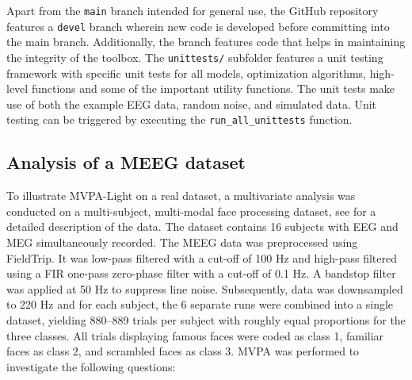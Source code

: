 \documentclass[utf8]{frontiersSCNS} %
\newcommand{\ttt}[1]{\texttt{#1}}
\begin{document}
Apart from the \ttt{main} branch intended for general use, the GitHub repository features a \ttt{devel} branch wherein new code is developed before committing into the main branch. Additionally, the branch features code that helps in maintaining the integrity of the toolbox. The \ttt{unittests/} subfolder features a unit testing framework with specific unit tests for all models, optimization algorithms, high-level functions and some of the important utility functions. The unit tests make use of both the example EEG data, random noise, and simulated data. Unit testing can be triggered by executing the \ttt{run\_all\_unittests} function.

\subsection{Analysis of a MEEG dataset}

To illustrate MVPA-Light on a real dataset, a multivariate analysis was conducted on a multi-subject, multi-modal face processing dataset, see  \cite{Wakeman2015ADataset,Wakeman2014OpenfMRI} for a detailed description of the data. The dataset contains 16 subjects with EEG and MEG simultaneously recorded. The MEEG data was preprocessed using FieldTrip. It was low-pass filtered with a cut-off of 100 Hz and high-pass filtered using a FIR one-pass zero-phase filter with a cut-off of 0.1 Hz. A bandstop filter was applied at 50 Hz to suppress line noise. Subsequently, data was downsampled to 220 Hz and for each subject, the 6 separate runs were combined into a single dataset, yielding 880--889 trials per subject with roughly equal proportions for the three classes. All trials displaying famous faces were coded as class 1, familiar faces as class 2, and scrambled faces as class 3. MVPA was performed to investigate the following questions:
\end{document}
